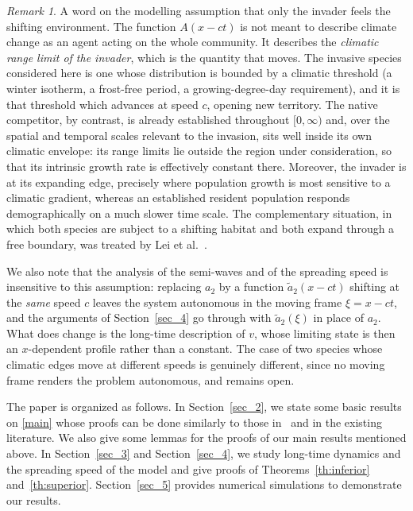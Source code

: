 \documentclass[reqno]{amsart}
\newcommand{\rev}[1]{#1}
\theoremstyle{plain}
\theoremstyle{definition}
\theoremstyle{remark}
\newtheorem{remark}{Remark}
\begin{document}
	\rev{\begin{remark}\label{rm:modelling}
		A word on the modelling assumption that only the invader feels the shifting
		environment. The function $A(x-ct)$ is not meant to describe climate change
		as an agent acting on the whole community. It describes the \emph{climatic
		range limit of the invader}, which is the quantity that moves. The invasive
		species considered here is one whose distribution is bounded by a climatic
		threshold (a winter isotherm, a frost-free period, a growing-degree-day
		requirement), and it is that threshold which advances at speed $c$, opening
		new territory. The native competitor, by contrast, is already established
		throughout $[0,\infty)$ and, over the spatial and temporal scales relevant
		to the invasion, sits well inside its own climatic envelope: its range
		limits lie outside the region under consideration, so that its intrinsic
		growth rate is effectively constant there. Moreover, the invader is at its
		expanding edge, precisely where population growth is most sensitive to a
		climatic gradient, whereas an established resident population responds
		demographically on a much slower time scale. The complementary situation,
		in which both species are subject to a shifting habitat and both expand
		through a free boundary, was treated by Lei et al.~\cite{Lei2018}.

		We also note that the analysis of the semi-waves and of the spreading speed
		is insensitive to this assumption: replacing $a_2$ by a function
		$\tilde a_2(x-ct)$ shifting at the \emph{same} speed $c$ leaves the system
		autonomous in the moving frame $\xi=x-ct$, and the arguments of
		Section~\ref{sec_4} go through with $\tilde a_2(\xi)$ in place of $a_2$.
		What does change is the long-time description of $v$, whose limiting state
		is then an $x$-dependent profile rather than a constant. The case of two
		species whose climatic edges move at different speeds is genuinely
		different, since no moving frame renders the problem autonomous, and
		remains open.
	\end{remark}}

	The paper is organized as follows. In Section~\ref{sec_2}, we state some basic results on \eqref{main} whose proofs can be done similarly to those in~\cite{MR3327894} and in the existing literature. We also give some lemmas for the proofs of our main results mentioned above. In Section~\ref{sec_3} and Section~\ref{sec_4}, we study long-time dynamics and the spreading speed of the model and give proofs of Theorems~\ref{th:inferior} and~\ref{th:superior}. Section~\ref{sec_5} provides numerical simulations to demonstrate our results.
	
\end{document}
